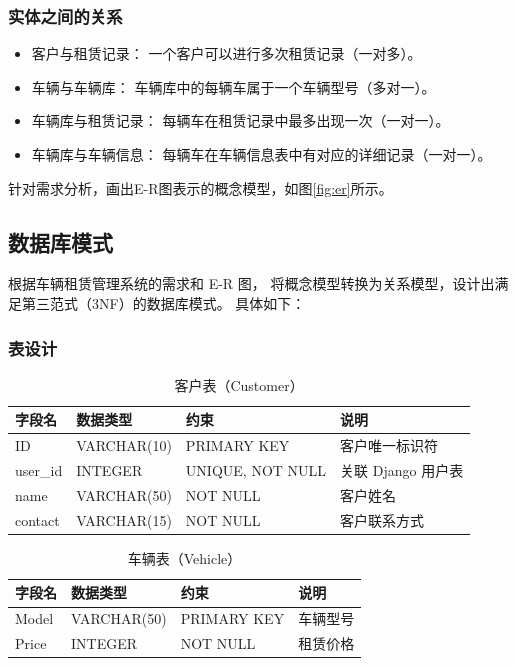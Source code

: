 \documentclass[UTF8,a4paper,12pt]{ctexart}
\begin{document}
\subsubsection{实体之间的关系} 
\begin{itemize}[leftmargin=0.3cm]
\item 客户与租赁记录：
一个客户可以进行多次租赁记录（一对多）。

\item 车辆与车辆库：
车辆库中的每辆车属于一个车辆型号（多对一）。

\item 车辆库与租赁记录：
每辆车在租赁记录中最多出现一次（一对一）。

\item 车辆库与车辆信息：
每辆车在车辆信息表中有对应的详细记录（一对一）。
\end{itemize}
针对需求分析，画出E-R图表示的概念模型，如图\ref{fig:er}所示。

\subsection{数据库模式}




根据车辆租赁管理系统的需求和 E-R 图，
将概念模型转换为关系模型，设计出满足第三范式（3NF）的数据库模式。
具体如下：

\subsubsection{表设计}


\begin{table}[h!]
    \centering
    \caption{客户表（Customer）}
\begin{tabular}{|l|l|l|l|}
\hline
字段名 & 数据类型 & 约束 & 说明 \\
\hline
ID & VARCHAR(10) & PRIMARY KEY & 客户唯一标识符 \\
\hline
user\_id & INTEGER & UNIQUE, NOT NULL & 关联 Django 用户表 \\
\hline
name & VARCHAR(50) & NOT NULL & 客户姓名 \\
\hline
contact & VARCHAR(15) & NOT NULL & 客户联系方式 \\
\hline
\end{tabular}
\end{table}


\begin{table}[h!]
    \centering
    \caption{车辆表（Vehicle）}
\begin{tabular}{|l|l|l|l|}
\hline
字段名 & 数据类型 & 约束 & 说明 \\
\hline
Model & VARCHAR(50) & PRIMARY KEY & 车辆型号 \\
\hline
Price & INTEGER & NOT NULL & 租赁价格 \\
\hline
\end{tabular}
\end{table}
\end{document}
